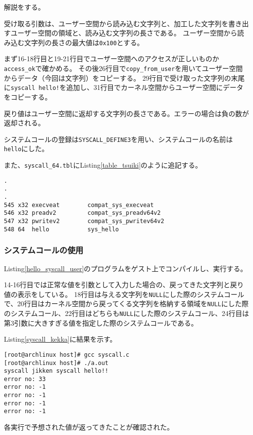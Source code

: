 \documentclass[main]{subfiles}
\begin{document}
解説をする。

受け取る引数は、ユーザー空間から読み込む文字列と、加工した文字列を書き出すユーザー空間の領域と、読み込む文字列の長さである。
ユーザー空間から読み込む文字列の長さの最大値は\texttt{0x100}とする。

まず16-18行目と19-21行目でユーザー空間へのアクセスが正しいものか\texttt{access\_ok}で確かめる。
その後26行目で\texttt{copy\_from\_user}を用いてユーザー空間からデータ（今回は文字列）をコピーする。
29行目で受け取った文字列の末尾に\texttt{syscall hello!}を追加し、31行目でカーネル空間からユーザー空間にデータをコピーする。

戻り値はユーザー空間に返却する文字列の長さである。エラーの場合は負の数が返却される。

システムコールの登録は\texttt{SYSCALL\_DEFINE3}を用い、システムコールの名前は\texttt{hello}にした。

また、\texttt{syscall\_64.tbl}にListing\ref{table_tsuiki}のように追記する。

\begin{lstlisting}[label=table_tsuiki,caption=\texttt{syscall\_64.tbl}に追加する]
.
.
.
545	x32	execveat		compat_sys_execveat
546	x32	preadv2			compat_sys_preadv64v2
547	x32	pwritev2		compat_sys_pwritev64v2
548 64  hello           sys_hello
\end{lstlisting}

\subsubsection{システムコールの使用}

Listing\ref{hello_syscall_user}のプログラムをゲスト上でコンパイルし、実行する。



14-16行目では正常な値を引数として入力した場合の、戻ってきた文字列と戻り値の表示をしている。
18行目は与える文字列を\texttt{NULL}にした際のシステムコールで、20行目はカーネル空間から戻ってくる文字列を格納する領域を\texttt{NULL}にした際のシステムコール、22行目はどちらも\texttt{NULL}にした際のシステムコール、24行目は第3引数に大きすぎる値を指定した際のシステムコールである。

Listing\ref{syscall_kekka}に結果を示す。

\begin{lstlisting}[label=syscall_kekka,caption=システムコールの実行結果]
[root@archlinux host]# gcc syscall.c
[root@archlinux host]# ./a.out
syscall jikken syscall hello!!
error no: 33
error no: -1
error no: -1
error no: -1
error no: -1
\end{lstlisting}

各実行で予想された値が返ってきたことが確認された。
\end{document}
